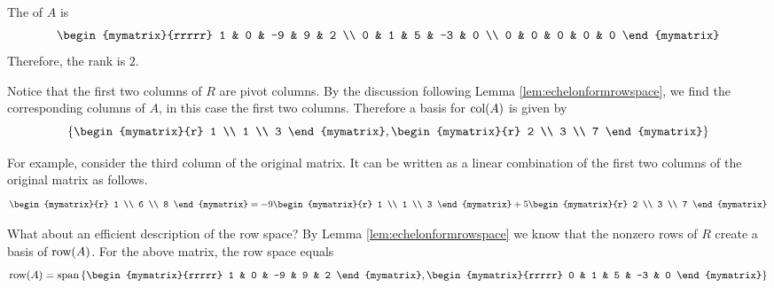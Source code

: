 \begin{solution}
The {\rref} of $A$ is 
\begin{equation*}
\begin{mymatrix}{rrrrr}
1 & 0 & -9 & 9 & 2 \\ 
0 & 1 & 5 & -3 & 0 \\ 
0 & 0 & 0 & 0 & 0
\end{mymatrix} 
\end{equation*}
Therefore, the rank is $2$.

Notice that the first two columns of $R$ are pivot columns. By the discussion following Lemma \ref{lem:echelonformrowspace}, we find the corresponding columns of $A$, in this case the first two columns. Therefore a basis for $\mbox{col}(A)$ is given by
\[
\left\{\begin{mymatrix}{r}
1 \\ 
1 \\ 
3
\end{mymatrix} , \begin{mymatrix}{r}
2 \\ 
3 \\ 
7
\end{mymatrix}
\right\}
\] 

 For
example, consider the third column of the original matrix. It can be written as a linear combination of the first two columns of the original matrix as follows.
\begin{equation*}
\begin{mymatrix}{r}
1 \\ 
6 \\ 
8
\end{mymatrix} =-9\begin{mymatrix}{r}
1 \\ 
1 \\ 
3
\end{mymatrix} +5\begin{mymatrix}{r}
2 \\ 
3 \\ 
7
\end{mymatrix} 
\end{equation*}

What about an efficient description of the row space? By Lemma \ref{lem:echelonformrowspace} we know that the nonzero rows of $R$ create a basis of $\mbox{row}(A)$.  For the above matrix, the row space equals 
\[
\func{row}(A) = 
\func{span} \left\{
\begin{mymatrix}{rrrrr}
1 & 0 & -9 & 9 & 2
\end{mymatrix}, \begin{mymatrix}{rrrrr}
0 & 1 & 5 & -3 & 0
\end{mymatrix}
\right\}
\]
\end{solution}

